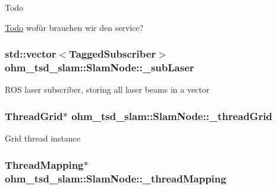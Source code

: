 \begin{DoxyRefDesc}{Todo}
\item[\hyperlink{todo__todo000006}{Todo}]wofür brauchen wir den service? \end{DoxyRefDesc}
\hypertarget{classohm__tsd__slam_1_1SlamNode_a34d64d8aeb88f263a8f1ee5d0966f3ce}{
\subsubsection[{\-\_\-sub\-Laser}]{\setlength{\rightskip}{0pt plus 5cm}std\-::vector$<${\bf Tagged\-Subscriber}$>$ ohm\-\_\-tsd\-\_\-slam\-::\-Slam\-Node\-::\-\_\-sub\-Laser\hspace{0.3cm}{\ttfamily [private]}}}\label{classohm__tsd__slam_1_1SlamNode_a34d64d8aeb88f263a8f1ee5d0966f3ce}
R\-O\-S laser subscriber, storing all laser beams in a vector \hypertarget{classohm__tsd__slam_1_1SlamNode_ab0dfdeb16f4b4ef1962c749954c77e32}{
\subsubsection[{\-\_\-thread\-Grid}]{\setlength{\rightskip}{0pt plus 5cm}Thread\-Grid$\ast$ ohm\-\_\-tsd\-\_\-slam\-::\-Slam\-Node\-::\-\_\-thread\-Grid\hspace{0.3cm}{\ttfamily [private]}}}\label{classohm__tsd__slam_1_1SlamNode_ab0dfdeb16f4b4ef1962c749954c77e32}
Grid thread instance \hypertarget{classohm__tsd__slam_1_1SlamNode_a6a6b18010b78fd8fbdf67aff45613c10}{
\subsubsection[{\-\_\-thread\-Mapping}]{\setlength{\rightskip}{0pt plus 5cm}Thread\-Mapping$\ast$ ohm\-\_\-tsd\-\_\-slam\-::\-Slam\-Node\-::\-\_\-thread\-Mapping\hspace{0.3cm}{\ttfamily [private]}}}\label{classohm__tsd__slam_1_1SlamNode_a6a6b18010b78fd8fbdf67aff45613c10}
